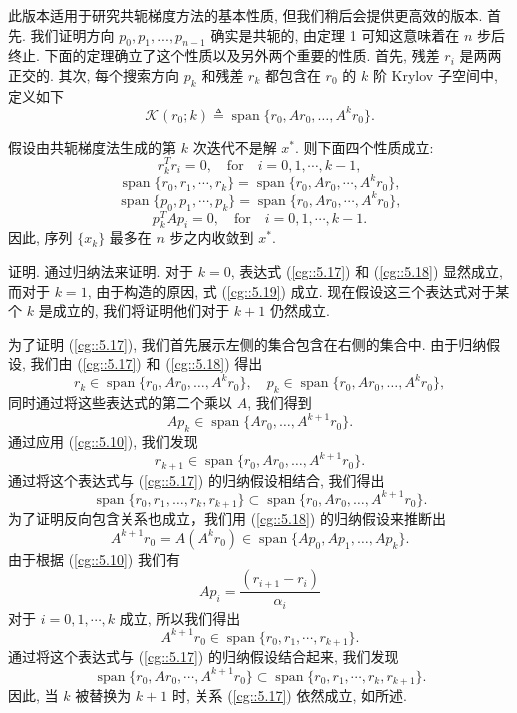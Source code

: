 \documentclass[a4paper]{ctexart}
\newcommand{\hl}[1]
{\noindent {\bf {#1}}}
\begin{document}
{此版本适用于研究共轭梯度方法的基本性质, 但我们稍后会提供更高效的版本. 
首先. 我们证明方向 $p_0, p_1, ..., p_{n-1}$ 确实是共轭的, 
由定理 1 可知这意味着在 $n$ 步后终止. 
下面的定理确立了这个性质以及另外两个重要的性质. 首先, 残差 $r_i$ 是两两正交的. 
其次, 每个搜索方向 $p_k$ 和残差 $r_k$ 都包含在 $r_0$ 的 $k$ 阶 
Krylov 子空间中, 定义如下
\begin{equation}
\mathscr{K} (r_0; k) \triangleq \operatorname{span} 
\{r_0, A r_0, \ldots, A^{k} r_0\}.
\label{cg::5.15}  
\end{equation}

\hl{定理 3}
假设由共轭梯度法生成的第 $k$ 次迭代不是解 $x^*$. 则下面四个性质成立:
\begin{equation}
  r_k^T r_i = 0, \quad \text{for} \quad i = 0, 1, \cdots, k - 1, 
  \label{cg::5.16}
\end{equation}
\begin{equation}
  \operatorname{span}\{r_0, r_1, \cdots, r_k \} 
  = \operatorname{span}\{r_0, A r_0, \cdots, A^k r_0 \}, 
  \label{cg::5.17}
\end{equation}
\begin{equation}
  \operatorname{span}\{p_0, p_1, \cdots, p_k \} 
  = \operatorname{span}\{r_0, A r_0, \cdots, A^k r_0 \}, 
  \label{cg::5.18}
\end{equation}
\begin{equation}
  p_k^T A p_i = 0, \quad \text{for} \quad i = 0, 1, \cdots, k - 1. 
  \label{cg::5.19}
\end{equation}
因此, 序列 $\{x_k\}$ 最多在 $n$ 步之内收敛到 $x^*$.

证明. 通过归纳法来证明. 对于 $k = 0$, 表达式 (\ref{cg::5.17}) 
和 (\ref{cg::5.18}) 显然成立, 而对于 $k = 1$, 由于构造的原因, 
式 (\ref{cg::5.19}) 成立. 现在假设这三个表达式对于某个 $k$ 是成立的, 
我们将证明他们对于 $k + 1$ 仍然成立.

为了证明 (\ref{cg::5.17}), 我们首先展示左侧的集合包含在右侧的集合中. 
由于归纳假设, 我们由 (\ref{cg::5.17}) 和 (\ref{cg::5.18}) 得出
$$
r_k \in \operatorname{span}\{r_0, A r_0, \ldots, A^k r_0\}, 
\quad p_k \in \operatorname{span}\{r_0, A r_0, \ldots, A^k r_0\},
$$
同时通过将这些表达式的第二个乘以 $A$, 我们得到
\begin{equation}
A p_k \in \operatorname{span}\{A r_0, \ldots, A^{k+1} r_0\}. 
\label{cg::5.20}
\end{equation}
通过应用 (\ref{cg::5.10}), 我们发现
$$
r_{k+1} \in \operatorname{span}\{r_0, A r_0, \ldots, A^{k+1} r_0\}.
$$
通过将这个表达式与 (\ref{cg::5.17}) 的归纳假设相结合, 我们得出
$$
\operatorname{span}\{r_0, r_1, \ldots, r_k, r_{k+1}\} 
\subset \operatorname{span}\{r_0, A r_0, \ldots, A^{k+1} r_0\}.
$$
为了证明反向包含关系也成立，我们用 (\ref{cg::5.18}) 的归纳假设来推断出
$$
A^{k+1} r_0 = A(A^{k} r_0) 
\in \operatorname{span}\{A p_0, A p_1, \ldots, A p_k\}.
$$
由于根据 (\ref{cg::5.10}) 我们有 
$$
A p_i = \frac{(r_{i+1} - r_i)}{\alpha_i}
$$ 
对于 $i = 0, 1, \cdots, k$ 成立, 所以我们得出
$$
A^{k+1} r_0 \in \operatorname{span}\{r_0, r_1, \cdots, r_{k + 1}\}.
$$
通过将这个表达式与 (\ref{cg::5.17}) 的归纳假设结合起来, 我们发现
$$
\operatorname{span}\{r_0, A r_0, \cdots, A^{k+1} r_0\} 
\subset \operatorname{span}\{r_0, r_1, \cdots, r_k, r_{k+1}\}.
$$
因此, 当 $k$ 被替换为 $k+1$ 时, 关系 (\ref{cg::5.17}) 依然成立, 如所述.

}
\end{document}
